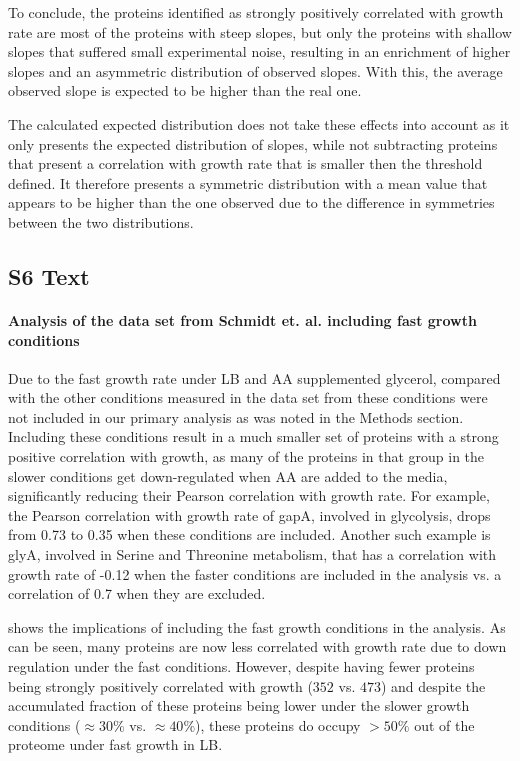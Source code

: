 \documentclass[10pt,letterpaper]{article}
\newcommand{\hGlobal}{$473$}
\newcommand{\hGlobalLB}{$352$}
\begin{document}
To conclude, the proteins identified as strongly positively correlated with growth rate are most of the proteins with steep slopes, but only the proteins with shallow slopes that suffered small experimental noise, resulting in an enrichment of higher slopes and an asymmetric distribution of observed slopes.
With this, the average observed slope is expected to be higher than the real one.

The calculated expected distribution does not take these effects into account as it only presents the expected distribution of slopes, while not subtracting proteins that present a correlation with growth rate that is smaller then the threshold defined.
It therefore presents a symmetric distribution with a mean value that appears to be higher than the one observed due to the difference in symmetries between the two distributions.

\subsection*{S6 Text}
\label{lbanalysis}
\paragraph{Analysis of the data set from Schmidt et. al. including fast growth conditions}
Due to the fast growth rate under LB and AA supplemented glycerol, compared with the other conditions measured in the data set from \cite{Schmidt2015} these conditions were not included in our primary analysis as was noted in the Methods section.
Including these conditions result in a much smaller set of proteins with a strong positive correlation with growth, as many of the proteins in that group in the slower conditions get down-regulated when AA are added to the media, significantly reducing their Pearson correlation with growth rate.
For example, the Pearson correlation with growth rate of gapA, involved in glycolysis, drops from 0.73 to 0.35 when these conditions are included.
Another such example is glyA, involved in Serine and Threonine metabolism, that has a correlation with
growth rate of -0.12 when the faster conditions are included in the analysis vs. a correlation of 0.7 when they are excluded.

 shows the implications of including the fast growth conditions in the analysis.
As can be seen, many proteins are now less correlated with growth rate due to down regulation under the fast conditions.
However, despite having fewer proteins being strongly positively correlated with growth (\hGlobalLB{} vs. \hGlobal{}) and despite the accumulated fraction of these proteins being lower under the slower growth conditions ($\approx30\%$ vs. $\approx40\%$), these proteins do occupy $>50\%$ out of the proteome under fast growth in LB.
\end{document}
